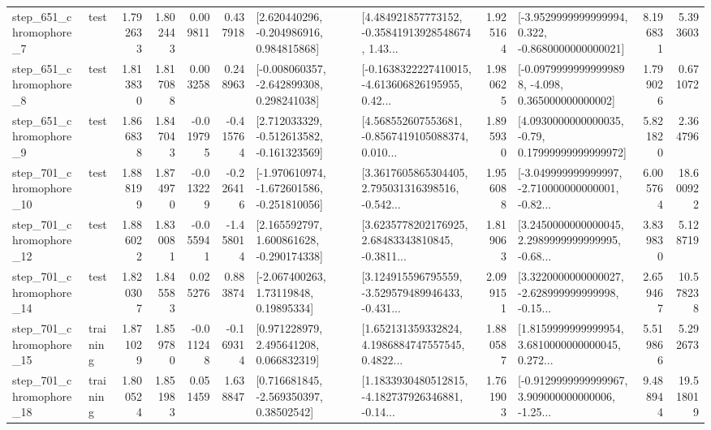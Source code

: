 \begin{tabular}{llrrrrllrlrr}
   step\_651\_chromophore\_7 &      test &      1.792633 &    1.802443 &      0.009811 &  0.437918 &    [2.620440296, -0.204986916, 0.984815868] &  [4.484921857773152, -0.35841913928548674, 1.43... &       1.925164 &  [-3.9529999999999994, 0.322, -0.8680000000000021] &            8.196831 &          5.393603 \\
   step\_651\_chromophore\_8 &      test &      1.813830 &    1.817088 &      0.003258 &  0.248963 &   [-0.008060357, -2.642899308, 0.298241038] &  [-0.1638322227410015, -4.613606826195955, 0.42... &       1.980625 &  [-0.09799999999999898, -4.098, 0.365000000000002] &            1.799026 &          0.671072 \\
   step\_651\_chromophore\_9 &      test &      1.866838 &    1.847043 &     -0.019795 & -0.415764 &   [2.712033329, -0.512613582, -0.161323569] &  [4.568552607553681, -0.8567419105088374, 0.010... &       1.895930 &   [4.0930000000000035, -0.79, 0.17999999999999972] &            5.821820 &          2.364796 \\
  step\_701\_chromophore\_10 &      test &      1.888199 &    1.874970 &     -0.013229 & -0.226416 &  [-1.970610974, -1.672601586, -0.251810056] &  [3.3617605865304405, 2.795031316398516, -0.542... &       1.956088 &  [-3.049999999999997, -2.710000000000001, -0.82... &            6.005764 &         18.600922 \\
  step\_701\_chromophore\_12 &      test &      1.886022 &    1.830081 &     -0.055941 & -1.458014 &    [2.165592797, 1.600861628, -0.290174338] &  [3.6235778202176925, 2.68483343810845, -0.3811... &       1.819063 &  [3.2450000000000045, 2.2989999999999995, -0.68... &            3.839830 &          5.128719 \\
  step\_701\_chromophore\_14 &      test &      1.820307 &    1.845583 &      0.025276 &  0.883874 &      [-2.067400263, 1.73119848, 0.19895334] &  [3.124915596795559, -3.529579489946433, -0.431... &       2.099151 &  [3.3220000000000027, -2.628999999999998, -0.15... &            2.659467 &         10.578238 \\
  step\_701\_chromophore\_15 &  training &      1.871029 &    1.859780 &     -0.011248 & -0.169314 &     [0.971228979, 2.495641208, 0.066832319] &  [1.652131359332824, 4.1986884747557545, 0.4822... &       1.880587 &  [1.8159999999999954, 3.6810000000000045, 0.272... &            5.519866 &          5.292673 \\
  step\_701\_chromophore\_18 &  training &      1.800524 &    1.851983 &      0.051459 &  1.638847 &     [0.716681845, -2.569350397, 0.38502542] &  [1.1833930480512815, -4.182737926346881, -0.14... &       1.761903 &  [-0.9129999999999967, 3.909000000000006, -1.25... &            9.488944 &         19.518019 \\

\end{tabular}
